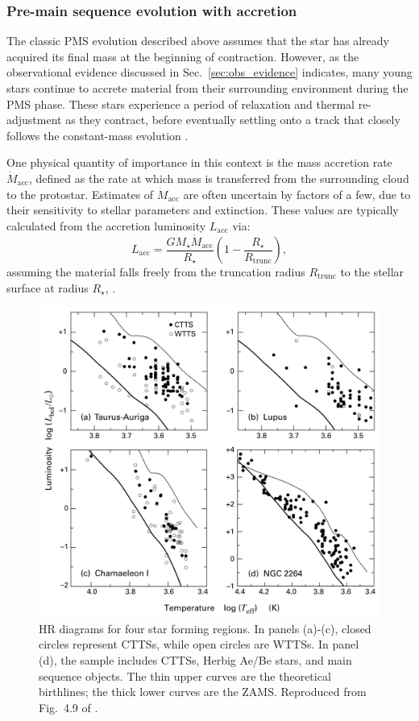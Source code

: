 \documentclass[12pt,a4paper]{article}
\newcommand{\mr}{\mathrm}
\begin{document}
\subsubsection{Pre-main sequence evolution with accretion}
\label{sec:pms_accretion}

The classic PMS evolution described above assumes that the star has already acquired its final mass at the beginning of contraction. However, as the observational evidence discussed in Sec.~\ref{sec:obs_evidence} indicates, many young stars continue to accrete material from their surrounding environment during the PMS phase. These stars experience a period of relaxation and thermal re-adjustment as they contract, before eventually settling onto a track that closely follows the constant-mass evolution \parencite{KippenhahnEtAl2013}.

One physical quantity of importance in this context is the mass accretion rate $\dot{M}_\mr{acc}$, defined as the rate at which mass is transferred from the surrounding cloud to the protostar. Estimates of $\dot{M}_\mr{acc}$ are often uncertain by factors of a few, due to their sensitivity to stellar parameters and extinction. These values are typically calculated from the accretion luminosity $L_\mr{acc}$ via:
\begin{equation}
  L_\mr{acc} = \frac{GM_\star \dot{M}_\mr{acc}}{R_\star}\left(1 - \frac{R_\star}{R_\mr{trunc}}\right),
\end{equation}
assuming the material falls freely from the truncation radius $R_\mr{trunc}$ to the stellar surface at radius $R_\star$, \parencite[see review by][]{HartmannEtAl2016}. 

\begin{figure}[htbp]
  \centering
  \includegraphics[width=.85\textwidth]{StahlerPalla2004_fig4p9.png}
  \caption{HR diagrams for four star forming regions. In panels (a)-(c), closed circles represent CTTSs, while open circles are WTTSs. In panel (d), the sample includes CTTSs, Herbig Ae/Be stars, and main sequence objects. The thin upper curves are the theoretical birthlines; the thick lower curves are the ZAMS. Reproduced from Fig.~4.9 of \textcite{StahlerPalla2004}.} \label{fig:obs_birthline} 
\end{figure}
\end{document}
